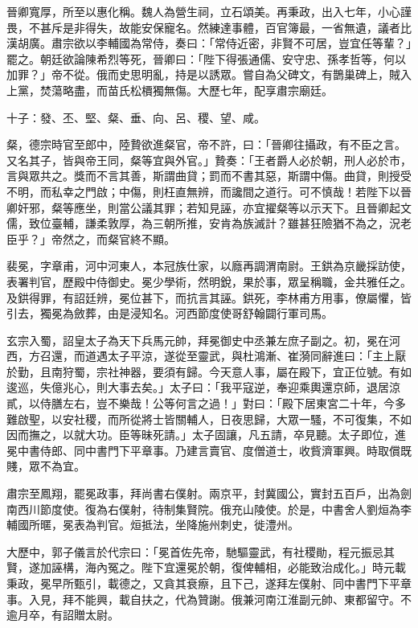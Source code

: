 \begin{pinyinscope}
 晉卿寬厚，所至以惠化稱。魏人為營生祠，立石頌美。再秉政，出入七年，小心謹畏，不甚斥是非得失，故能安保寵名。然練達事體，百官簿最，一省無遺，議者比漢胡廣。肅宗欲以李輔國為常侍，奏曰：「常侍近密，非賢不可居，豈宜任等輩？」罷之。朝廷欲論陳希烈等死，晉卿曰：「陛下得張通儒、安守忠、孫孝哲等，何以加罪？」帝不從。俄而史思明亂，持是以誘眾。嘗自為父碑文，有鵲巢碑上，賊入上黨，焚蕩略盡，而苗氏松檟獨無傷。大歷七年，配享肅宗廟廷。



 十子：發、丕、堅、粲、垂、向、呂、稷、望、咸。



 粲，德宗時官至郎中，陸贄欲進粲官，帝不許，曰：「晉卿往攝政，有不臣之言。又名其子，皆與帝王同，粲等宜與外官。」贄奏：「王者爵人必於朝，刑人必於市，言與眾共之。獎而不言其善，斯謂曲貸；罰而不書其惡，斯謂中傷。曲貸，則授受不明，而私幸之門啟；中傷，則枉直無辨，而讒間之道行。可不慎哉！若陛下以晉卿奸邪，粲等應坐，則當公議其罪；若知見誣，亦宜擢粲等以示天下。且晉卿起文儒，致位臺輔，謙柔敦厚，為三朝所推，安肯為族滅計？雖甚狂險猶不為之，況老臣乎？」帝然之，而粲官終不顯。



 裴冕，字章甫，河中河東人，本冠族仕家，以廕再調渭南尉。王鉷為京畿採訪使，表署判官，歷殿中侍御史。冕少學術，然明銳，果於事，眾呈稱職，金共雅任之。及鉷得罪，有詔廷辨，冕位甚下，而抗言其誣。鉷死，李林甫方用事，僚屬懼，皆引去，獨冕為斂葬，由是浸知名。河西節度使哥舒翰闢行軍司馬。



 玄宗入蜀，詔皇太子為天下兵馬元帥，拜冕御史中丞兼左庶子副之。初，冕在河西，方召還，而道遇太子平涼，遂從至靈武，與杜鴻漸、崔漪同辭進曰：「主上厭於勤，且南狩蜀，宗社神器，要須有歸。今天意人事，屬在殿下，宜正位號。有如逡巡，失億兆心，則大事去矣。」太子曰：「我平寇逆，奉迎乘輿還京師，退居涼貳，以侍膳左右，豈不樂哉！公等何言之過！」對曰：「殿下居東宮二十年，今多難啟聖，以安社稷，而所從將士皆關輔人，日夜思歸，大眾一騷，不可復集，不如因而撫之，以就大功。臣等昧死請。」太子固讓，凡五請，卒見聽。太子即位，進冕中書侍郎、同中書門下平章事。乃建言賣官、度僧道士，收貲濟軍興。時取償既賤，眾不為宜。



 肅宗至鳳翔，罷冕政事，拜尚書右僕射。兩京平，封冀國公，實封五百戶，出為劍南西川節度使。復為右僕射，待制集賢院。俄充山陵使。於是，中書舍人劉烜為李輔國所暱，冕表為判官。烜抵法，坐降施州刺史，徙澧州。



 大歷中，郭子儀言於代宗曰：「冕首佐先帝，馳驅靈武，有社稷勛，程元振忌其賢，遂加誣構，海內冤之。陛下宜還冕於朝，復俾輔相，必能致治成化。」時元載秉政，冕早所甄引，載德之，又貪其衰瘵，且下己，遂拜左僕射、同中書門下平章事。入見，拜不能興，載自扶之，代為贊謝。俄兼河南江淮副元帥、東都留守。不逾月卒，有詔贈太尉。




\end{pinyinscope}
